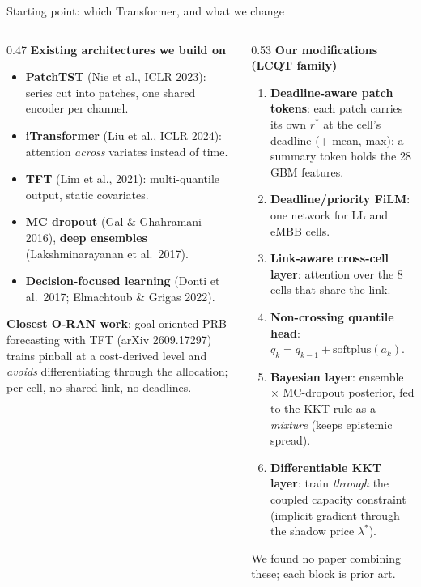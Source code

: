 \documentclass[aspectratio=169,11pt,xcolor=table]{beamer}
\newcommand{\rstar}{r^{\ast}}
\begin{document}
\begin{frame}{Starting point: which Transformer, and what we change}
  \scriptsize
  \begin{columns}[T]
    \begin{column}{0.47\textwidth}
      \textbf{Existing architectures we build on}
      \begin{itemize}
        \item \textbf{PatchTST} (Nie et al., ICLR 2023): series cut into patches, one shared encoder per channel.
        \item \textbf{iTransformer} (Liu et al., ICLR 2024): attention \emph{across} variates instead of time.
        \item \textbf{TFT} (Lim et al., 2021): multi-quantile output, static covariates.
        \item \textbf{MC dropout} (Gal \& Ghahramani 2016), \textbf{deep ensembles} (Lakshminarayanan et al.\ 2017).
        \item \textbf{Decision-focused learning} (Donti et al.\ 2017; Elmachtoub \& Grigas 2022).
      \end{itemize}
      \textbf{Closest O-RAN work}: goal-oriented PRB forecasting with TFT (arXiv 2609.17297) trains pinball at a cost-derived level and \emph{avoids} differentiating through the allocation; per cell, no shared link, no deadlines.
    \end{column}
    \begin{column}{0.53\textwidth}
      \textbf{Our modifications (LCQT family)}
      \begin{enumerate}
        \item \textbf{Deadline-aware patch tokens}: each patch carries its own $\rstar$ at the cell's deadline (+ mean, max); a summary token holds the 28 GBM features.
        \item \textbf{Deadline/priority FiLM}: one network for LL and eMBB cells.
        \item \textbf{Link-aware cross-cell layer}: attention over the 8 cells that share the link.
        \item \textbf{Non-crossing quantile head}: $q_k = q_{k-1} + \mathrm{softplus}(a_k)$.
        \item \textbf{Bayesian layer}: ensemble $\times$ MC-dropout posterior, fed to the KKT rule as a \emph{mixture} (keeps epistemic spread).
        \item \textbf{Differentiable KKT layer}: train \emph{through} the coupled capacity constraint (implicit gradient through the shadow price $\lambda^\ast$).
      \end{enumerate}
      \vspace{2pt}
      \textcolor{accent}{We found no paper combining these; each block is prior art.}
    \end{column}
  \end{columns}
\end{frame}
\end{document}
